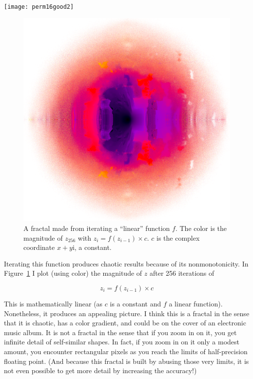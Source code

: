 \documentclass[twocolumn]{article}
\begin{document}
\begin{center}
\texttt{[image: perm16good2]}
\end{center}

\begin{figure}[htp]
  \includegraphics[width=0.95 \linewidth]{perm16frac}
  \caption{
    A fractal made from iterating a ``linear'' function $f$. The color
    is the magnitude of $z_{256}$ with $z_i = f(z_{i-1}) \times c$.
    $c$ is the complex coordinate $x + y\mathrm{i}$, a constant.
  } \label{fig:perm16frac}
\end{figure}

Iterating this function produces chaotic results because of its
nonmonotonicity. In Figure~\ref{fig:perm16frac} I plot (using color)
the magnitude of $z$ after 256 iterations of

$$z_i = f(z_{i-1}) \times c$$

This is mathematically linear (as $c$ is a constant and $f$ a linear
function). Nonetheless, it produces an appealing picture. I think this
is a fractal in the sense that it is chaotic, has a color gradient,
and could be on the cover of an electronic music album. It is not a
fractal in the sense that if you zoom in on it, you get infinite
detail of self-similar shapes. In fact, if you zoom in on it only a
modest amount, you encounter rectangular pixels as you reach the
limits of half-precision floating point. (And because this fractal is
built by abusing those very limits, it is not even possible to get
more detail by increasing the accuracy!)
\end{document}

